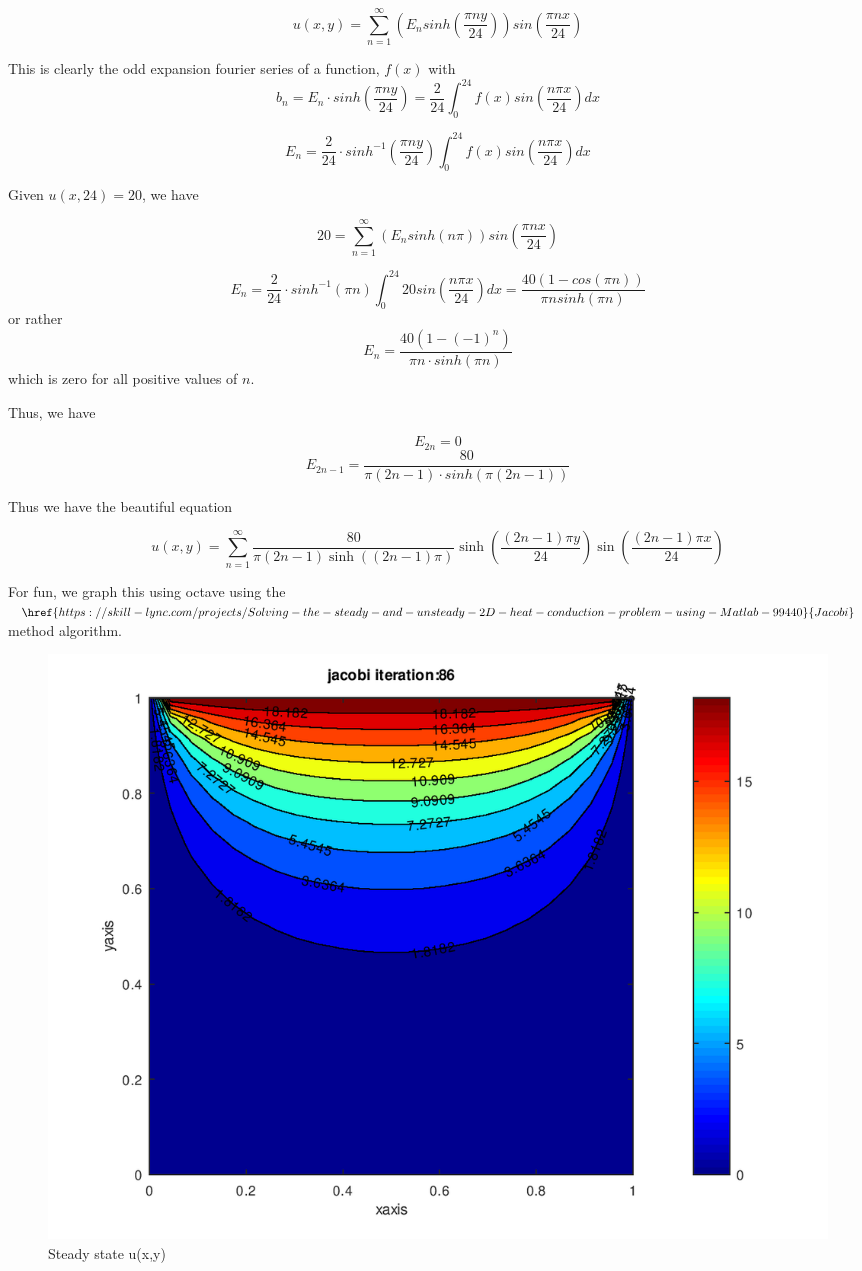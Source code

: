 \documentclass{article}
\begin{document}
$$u(x,y) = \sum_{n=1}^{\infty} \left( E_n sinh\left(\frac{\pi n y}{24}\right)\right)sin\left(\frac{\pi n x}{24}\right)$$


This is clearly the odd expansion fourier series of a function, $f(x)$ with
$$b_n = E_n \cdot sinh\left(\frac{\pi n y}{24}\right) = \frac{2}{24} \int_0^{24} f(x) sin\left(\frac{n \pi x}{24}\right) dx$$

$$E_n = \frac{2}{24} \cdot sinh^{-1}\left(\frac{\pi n y}{24}\right) \int_0^{24} f(x) sin\left(\frac{n \pi x}{24}\right) dx$$



Given $u(x,24) = 20$, we have

$$20 = \sum_{n=1}^{\infty} \left( E_n sinh(n \pi)\right)sin\left(\frac{\pi n x}{24}\right)$$

$$E_n = \frac{2}{24} \cdot sinh^{-1}\left(\pi n\right) \int_0^{24} 20 sin\left(\frac{n \pi x}{24}\right) dx =  \frac{40(1-cos(\pi n))}{\pi nsinh(\pi n)}$$
or rather
$$E_n = \frac{40(1-(-1)^n)}{\pi n \cdot sinh(\pi n)}$$
which is zero for all positive values of $n$.

Thus, we have

$$E_{2n} = 0$$
$$E_{2n-1} = \frac{80}{\pi (2n-1) \cdot sinh(\pi (2n-1))}$$


Thus we have the beautiful equation

$$u\left(x,y\right)=\sum_{n=1}^{\infty}\frac{80}{\pi\left(2n-1\right)\sinh\left(\left(2n-1\right)\pi\right)}\sinh\left(\frac{\left(2n-1\right)\pi y}{24}\right)\sin\left(\frac{\left(2n-1\right)\pi x}{24}\right)$$

For fun, we graph this using octave using the $\href{https://skill-lync.com/projects/Solving-the-steady-and-unsteady-2D-heat-conduction-problem-using-Matlab-99440}{Jacobi}$ method algorithm.

\begin{figure}
\includegraphics[width=1.0\textwidth]{./static/Jacobi.png}
\caption{Steady state u(x,y)}
\end{figure}
\end{document}
